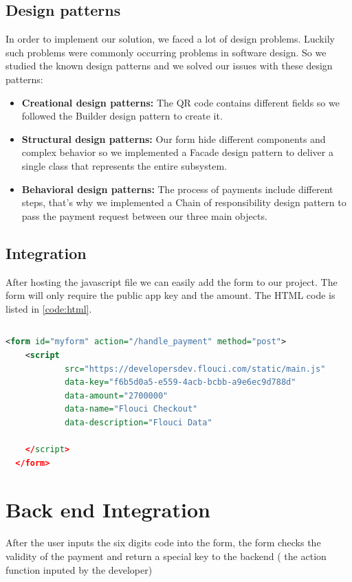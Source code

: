 \begin{spacing}{1.2}
\subsection{Design patterns}
In order to implement our solution, we faced a lot of design problems. Luckily such problems were commonly occurring problems in software design. So we studied the known design patterns\cite{designpattern} and we solved our issues with these design patterns:
\begin{itemize}
	\item \textbf{Creational design patterns\cite{designpattern}:} The QR code contains different fields so we followed the Builder design pattern to create it.
	\item \textbf{Structural design patterns\cite{designpattern}:} Our form hide different components and complex behavior so we implemented a Facade design pattern to deliver a single class that 
	 represents the entire subsystem.
	 \item \textbf{Behavioral design patterns\cite{designpattern}:} The process of payments include different steps, that's why we implemented a  Chain of responsibility design pattern to pass the payment request between our three main objects.
\end{itemize}
\subsection{Integration}
After hosting the javascript file we can easily add the form to our project. The form will only require the public app key  and the amount.
The HTML code is listed in \ref{code:html}.
\begin{lstlisting}[rulecolor=\color{white}]
\end{lstlisting}
\begin{lstlisting}[label=code:html,caption=Flouci Integration Java,language=xml]
 <form id="myform" action="/handle_payment" method="post">
    <script
            src="https://developersdev.flouci.com/static/main.js"
            data-key="f6b5d0a5-e559-4acb-bcbb-a9e6ec9d788d"
            data-amount="2700000"
            data-name="Flouci Checkout"
            data-description="Flouci Data"

    </script>
  </form>
\end{lstlisting}


\section{Back end Integration}
After the user inputs the six digits code into the form, the form checks the validity of the payment and return a special key to the backend ( the action function inputed by the developer)


\end{spacing}
